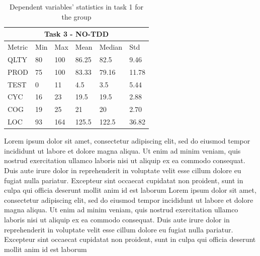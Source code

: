 \begin{table}[!h]
    \begin{center} 
        \begin{tabular}{ |p{2cm}||p{1.6cm}|p{1.6cm}|p{1.6cm}|p{1.6cm}|p{1.6cm}|}
            \hline
                \multicolumn{6}{|c|}{Task 3 - NO-TDD} \\
            \hline
                Metric & Min & Max & Mean & Median & Std\\
            \hline
                QLTY & 80 & 100 & 86.25 & 82.5 & 9.46 \\
                PROD & 75 & 100 & 83.33 & 79.16 & 11.78 \\
                TEST & 0 & 11 & 4.5 & 3.5 & 5.44 \\
                CYC & 16 & 23 & 19.5 & 19.5 & 2.88 \\
                COG & 19 & 25 & 21 & 20 & 2.70 \\
                LOC & 93 & 164 & 125.5 & 122.5 & 36.82 \\
            \hline
        \end{tabular}
        \caption{\label{tab_dv_t1_2_notdd}Dependent variables' statistics in task 1 for the \notdd group}
    \end{center}
\end{table}

Lorem ipsum dolor sit amet, consectetur adipiscing elit, sed do eiusmod tempor incididunt ut labore et dolore magna aliqua. Ut enim ad minim veniam, quis nostrud exercitation ullamco laboris nisi ut aliquip ex ea commodo consequat. Duis aute irure dolor in reprehenderit in voluptate velit esse cillum dolore eu fugiat nulla pariatur. Excepteur sint occaecat cupidatat non proident, sunt in culpa qui officia deserunt mollit anim id est laborum
Lorem ipsum dolor sit amet, consectetur adipiscing elit, sed do eiusmod tempor incididunt ut labore et dolore magna aliqua. Ut enim ad minim veniam, quis nostrud exercitation ullamco laboris nisi ut aliquip ex ea commodo consequat. Duis aute irure dolor in reprehenderit in voluptate velit esse cillum dolore eu fugiat nulla pariatur. Excepteur sint occaecat cupidatat non proident, sunt in culpa qui officia deserunt mollit anim id est laborum

